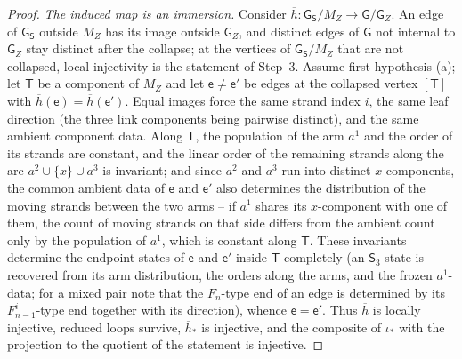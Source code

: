 \documentclass[reqno]{amsart}
\theoremstyle{definition}
\newcommand\sfG{\mathsf{G}}
\newcommand\sfS{\mathsf{S}}
\newcommand\sfT{\mathsf{T}}
\newcommand\sfe{\mathsf{e}}
\renewcommand{\bar}{\overline}
\numberwithin{equation}{section}
\begin{document}
\begin{proof}
\smallskip
\noindent\emph{The induced map is an immersion.}
Consider \(\bar h\colon\sfG_\sfS/M_Z\to\sfG/\sfG_Z\). An edge of
\(\sfG_\sfS\) outside \(M_Z\) has its image outside \(\sfG_Z\), and
distinct edges of \(\sfG\) not internal to \(\sfG_Z\) stay
distinct after the collapse; at the vertices of \(\sfG_\sfS/M_Z\)
that are not collapsed, local injectivity is the statement of
Step~3. Assume first hypothesis (a); let \(\sfT\) be a component of
\(M_Z\) and let
\(\sfe\neq \sfe'\) be edges at the collapsed vertex \([\sfT]\) with
\(\bar h(\sfe)=\bar h(\sfe')\). Equal images force the same strand index
\(i\), the same leaf direction (the three link components being
pairwise distinct), and the same ambient component data. Along
\(\sfT\), the population of the arm \(a^1\) and the order of its
strands are constant, and the linear order of the remaining
strands along the arc \(a^2\cup\{x\}\cup a^3\) is invariant; and
since \(a^2\) and \(a^3\) run into distinct \(x\)-components, the
common ambient data of \(\sfe\) and \(\sfe'\) also determines the
distribution of the moving strands between the two arms -- if
\(a^1\) shares its \(x\)-component with one of them, the count of
moving strands on that side differs from the ambient count only by
the population of \(a^1\), which is constant along \(\sfT\). These invariants determine
the endpoint states of \(\sfe\) and \(\sfe'\) inside \(\sfT\) completely
(an \(\sfS_3\)-state is recovered from its arm distribution, the
orders along the arms, and the frozen \(a^1\)-data; for a mixed
pair note that the \(F_n\)-type end of an edge is determined by
its \(F^i_{n-1}\)-type end together with its direction), whence
\(\sfe=\sfe'\). Thus \(\bar h\) is locally injective, reduced loops
survive, \(\bar h_\ast\) is injective, and the composite of
\(\iota_\ast\) with the projection to the quotient of the
statement is injective.


\end{proof}
\end{document}

